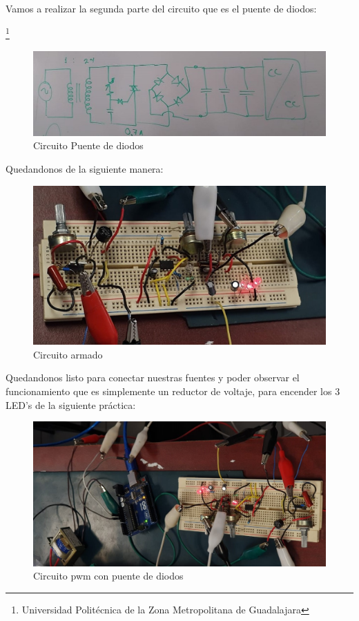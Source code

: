 \documentclass[10pt,a4paper]{article}
\begin{document}
Vamos a realizar la segunda parte del circuito que es el puente de diodos: 

\footnote{Universidad Politécnica de la Zona Metropolitana de Guadalajara}

\newpage
\begin{figure}[hbtp]
\centering
\includegraphics[scale=0.7]{Pictures/Puente.jpeg}
\caption{Circuito Puente de diodos}
\end{figure}

Quedandonos de la siguiente manera: 
\begin{figure}[hbtp]
\centering
\includegraphics[scale=0.3]{Pictures/Pwm3.jpeg}
\caption{Circuito armado}
\end{figure}

Quedandonos listo para conectar nuestras fuentes y poder observar el funcionamiento que es simplemente un reductor de voltaje, para encender los 3 LED's de la siguiente práctica: 
\begin{figure}[hbtp]
\centering
\includegraphics[scale=0.3]{Pictures/pwm1.jpeg}
\caption{Circuito pwm con puente de diodos}
\end{figure}
\end{document}
